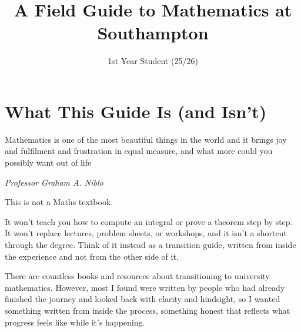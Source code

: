 \documentclass[12pt]{report}
\begin{document}
\title{A Field Guide to Mathematics at Southampton}
\author{
  1st Year Student (25/26) 
}

\maketitle

\chapter*{What This Guide Is (and Isn't)} 


\epigraph{Mathematics is one of the most beautiful things in the world and it brings joy and fulfilment and frustration in equal measure, and what more could you possibly want out of life}
{\textit{Professor Graham A. Niblo}}





This is not a Maths textbook.

It won’t teach you how to compute an integral or prove a theorem step by step. It won’t replace lectures, problem sheets, or workshops, and it isn’t a shortcut through the degree. Think of it instead as a transition guide, written from inside the experience and not from the other side of it.

There are countless books and resources about transitioning to university mathematics. However, most I found were written by people who had already finished the journey and looked back with clarity and hindsight, so I wanted something written from inside the process, something honest that reflects what progress feels like while it's happening. 
\end{document}
